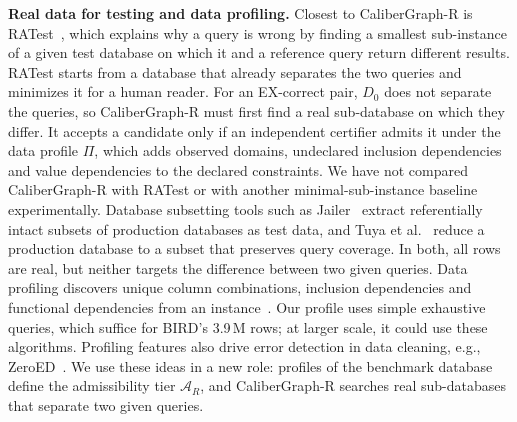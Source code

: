 \textbf{Real data for testing and data profiling.} Closest to CaliberGraph-R is RATest~\cite{miao2019ratest}, which explains why a query is wrong by finding a smallest sub-instance of a given test database on which it and a reference query return different results. RATest starts from a database that already separates the two queries and minimizes it for a human reader. For an EX-correct pair, $D_0$ does not separate the queries, so CaliberGraph-R must first find a real sub-database on which they differ. It accepts a candidate only if an independent certifier admits it under the data profile $\Pi$, which adds observed domains, undeclared inclusion dependencies and value dependencies to the declared constraints. We have not compared CaliberGraph-R with RATest or with another minimal-sub-instance baseline experimentally. Database subsetting tools such as Jailer~\cite{jailer} extract referentially intact subsets of production databases as test data, and Tuya et al.~\cite{tuya2016reduction} reduce a production database to a subset that preserves query coverage. In both, all rows are real, but neither targets the difference between two given queries. Data profiling discovers unique column combinations, inclusion dependencies and functional dependencies from an instance~\cite{abedjan2015profiling,papenbrock2016hyfd,papenbrock2015binder}. Our profile uses simple exhaustive queries, which suffice for BIRD's 3.9\,M rows; at larger scale, it could use these algorithms. Profiling features also drive error detection in data cleaning, e.g., ZeroED~\cite{ni2025zeroed}. We use these ideas in a new role: profiles of the benchmark database define the admissibility tier $\mathcal A_R$, and CaliberGraph-R searches real sub-databases that separate two given queries.
